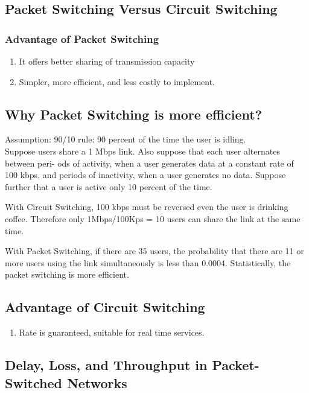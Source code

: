 \subsection{Packet Switching Versus Circuit Switching}

\subsubsection{Advantage of Packet Switching}
\begin{enumerate}
    \item It offers better sharing of transmission capacity
    \item Simpler, more efficient, and less costly to implement.
\end{enumerate}

\subsection{Why Packet Switching is more efficient?}

Assumption: 90/10 rule: 90 percent of the time the user is idling.\\

Suppose users share a 1 Mbps link. Also suppose that each user alternates between peri-
ods of activity, when a user generates data at a constant rate of 100 kbps, and periods
of inactivity, when a user generates no data. Suppose further that a user is active
only 10 percent of the time.

With Circuit Switching, 100 kbps must be reversed even the user is drinking coffee. Therefore only 1Mbps/100Kps = 10
users can share the link at the same time.

With Packet Switching, if there are 35 users, the probability that there are 11 or more users using the link simultaneously is less
than 0.0004. Statistically, the packet switching is more efficient.

\subsection{Advantage of Circuit Switching}
\begin{enumerate}
    \item Rate is guaranteed, suitable for real time services.
\end{enumerate}


\subsection{Delay, Loss, and Throughput in Packet-Switched Networks}

